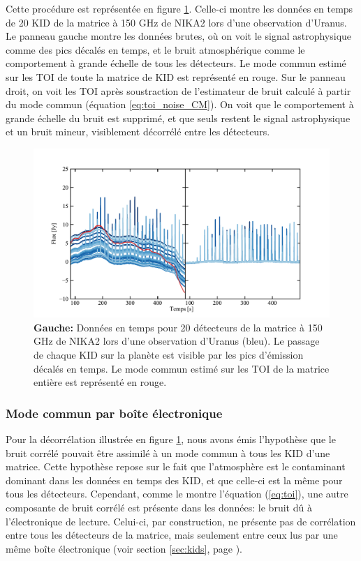Cette procédure est représentée en figure \ref{fig:toi_decor_1CM}.
Celle-ci montre les données en temps de 20 KID de la matrice à 150 GHz de NIKA2 lors d'une observation d'Uranus.
Le panneau gauche montre les données brutes, où on voit le signal astrophysique comme des pics décalés en temps, et le bruit atmosphérique comme le comportement à grande échelle de tous les détecteurs.
Le mode commun estimé sur les TOI de toute la matrice de KID est représenté en rouge.
Sur le panneau droit, on voit les TOI après soustraction de l'estimateur de bruit calculé à partir du mode commun (équation \ref{eq:toi_noise_CM}).
On voit que le comportement à grande échelle du bruit est supprimé, et que seuls restent le signal astrophysique et un bruit mineur, visiblement décorrélé entre les détecteurs.
\begin{figure}[t]
    \centering
    \includegraphics[width=.95\linewidth]{Figures/Chap_decor/toi.pdf}
    \caption{
        \textbf{Gauche:} Données en temps pour 20 détecteurs de la matrice à 150 GHz de NIKA2 lors d'une observation d'Uranus (bleu).
        Le passage de chaque KID sur la planète est visible par les pics d'émission décalés en temps.
        Le mode commun estimé sur les TOI de la matrice entière est représenté en rouge.
    }
    \label{fig:toi_decor_1CM}
\end{figure}

\subsubsection{Mode commun par boîte électronique} %
Pour la décorrélation illustrée en figure \ref{fig:toi_decor_1CM}, nous avons émis l'hypothèse que le bruit corrélé pouvait être assimilé à un mode commun à tous les KID d'une matrice.
Cette hypothèse repose sur le fait que l'atmosphère est le contaminant dominant dans les données en temps des KID, et que celle-ci est la même pour tous les détecteurs.
Cependant, comme le montre l'équation (\ref{eq:toi}), une autre composante de bruit corrélé est présente dans les données: le bruit dû à l'électronique de lecture.
Celui-ci, par construction, ne présente pas de corrélation entre tous les détecteurs de la matrice, mais seulement entre ceux lus par une même boîte électronique (voir section \ref{sec:kids}, page \pageref{sec:kids}).

